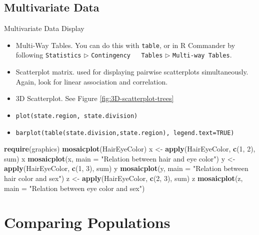 \documentclass[]{book}
\newenvironment{Shaded}{\begin{snugshade}}{\end{snugshade}}
\newcommand{\KeywordTok}[1]{\textcolor[rgb]{0.13,0.29,0.53}{\textbf{{#1}}}}
\newcommand{\DataTypeTok}[1]{\textcolor[rgb]{0.13,0.29,0.53}{{#1}}}
\newcommand{\DecValTok}[1]{\textcolor[rgb]{0.00,0.00,0.81}{{#1}}}
\newcommand{\StringTok}[1]{\textcolor[rgb]{0.31,0.60,0.02}{{#1}}}
\newcommand{\NormalTok}[1]{{#1}}
\providecommand{\tightlist}{%
  \setlength{\itemsep}{0pt}\setlength{\parskip}{0pt}}
\numberwithin{equation}{chapter}
\numberwithin{figure}{chapter}
\theoremstyle{plain}
\theoremstyle{definition}
\theoremstyle{remark}
\theoremstyle{definition}
\theoremstyle{definition}
\theoremstyle{remark}
\begin{document}
\subsection{Multivariate Data}\label{sub-multivariate-data}

Multivariate Data Display

\begin{itemize}
\tightlist
\item
  Multi-Way Tables. You can do this with \texttt{table}, or in R
  Commander by following \texttt{Statistics} \(\triangleright\)
  \texttt{Contingency\ \ \ Tables} \(\triangleright\)
  \texttt{Multi-way\ Tables}.
\item
  Scatterplot matrix. used for displaying pairwise scatterplots
  simultaneously. Again, look for linear association and correlation.
\item
  3D Scatterplot. See Figure \ref{fig:3D-scatterplot-trees}
\item
  \texttt{plot(state.region,\ state.division)}
\item
  \texttt{barplot(table(state.division,state.region),\ legend.text=TRUE)}
\end{itemize}

\begin{Shaded}
\begin{Highlighting}[]
\KeywordTok{require}\NormalTok{(graphics)}
\KeywordTok{mosaicplot}\NormalTok{(HairEyeColor)}
\NormalTok{x <-}\StringTok{ }\KeywordTok{apply}\NormalTok{(HairEyeColor, }\KeywordTok{c}\NormalTok{(}\DecValTok{1}\NormalTok{, }\DecValTok{2}\NormalTok{), sum)}
\NormalTok{x}
\KeywordTok{mosaicplot}\NormalTok{(x, }\DataTypeTok{main =} \StringTok{"Relation between hair and eye color"}\NormalTok{)}
\NormalTok{y <-}\StringTok{ }\KeywordTok{apply}\NormalTok{(HairEyeColor, }\KeywordTok{c}\NormalTok{(}\DecValTok{1}\NormalTok{, }\DecValTok{3}\NormalTok{), sum)}
\NormalTok{y}
\KeywordTok{mosaicplot}\NormalTok{(y, }\DataTypeTok{main =} \StringTok{"Relation between hair color and sex"}\NormalTok{)}
\NormalTok{z <-}\StringTok{ }\KeywordTok{apply}\NormalTok{(HairEyeColor, }\KeywordTok{c}\NormalTok{(}\DecValTok{2}\NormalTok{, }\DecValTok{3}\NormalTok{), sum)}
\NormalTok{z}
\KeywordTok{mosaicplot}\NormalTok{(z, }\DataTypeTok{main =} \StringTok{"Relation between eye color and sex"}\NormalTok{)}
\end{Highlighting}
\end{Shaded}

\section{Comparing Populations}\label{sec-comparing-data-sets}
\end{document}
